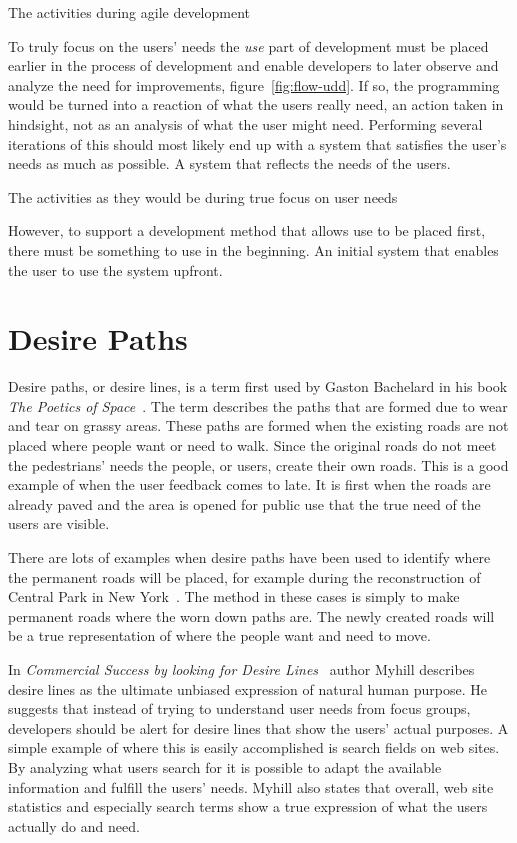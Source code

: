 \documentclass[a4paper]{report}
\begin{document}
	{The activities during agile development}

\label{sec:use-first}To truly focus on the users' needs the \emph{use} part of development must be placed earlier in the process of development and enable developers to later observe and analyze the need for improvements, figure~\ref{fig:flow-udd}. If so, the programming would be turned into a reaction of what the users really need, an action taken in hindsight, not as an analysis of what the user might need. Performing several iterations of this should most likely end up with a system that satisfies the user’s needs as much as possible. A system that reflects the needs of the users.

	{The activities as they would be during true focus on user needs}

However, to support a development method that allows use to be placed first, there must be something to use in the beginning. An initial system that enables the user to use the system upfront.

\section{Desire Paths}
\label{sec:desirepaths}
Desire paths, or desire lines, is a term first used by Gaston Bachelard in his book \emph{The Poetics of Space}~\cite{Bachelard:1994}. The term describes the paths that are formed due to wear and tear on grassy areas. These paths are formed when the existing roads are not placed where people want or need to walk. Since the original roads do not meet the pedestrians' needs the people, or users, create their own roads. This is a good example of when the user feedback comes to late. It is first when the roads are already paved and the area is opened for public use that the true need of the users are visible.

There are lots of examples when desire paths have been used to identify where the permanent roads will be placed, for example during the reconstruction of Central Park in New York~\cite{Barlow-Rogers:1987}. The method in these cases is simply to make permanent roads where the worn down paths are. The newly created roads will be a true representation of where the people want and need to move.

In \emph{Commercial Success by looking for Desire Lines}~\cite{Myhill:2004} author Myhill describes desire lines as the ultimate unbiased expression of natural human purpose. He suggests that instead of trying to understand user needs from focus groups, developers should be alert for desire lines that show the users' actual purposes. A simple example of where this is easily accomplished is search fields on web sites. By analyzing what users search for it is possible to adapt the available information and fulfill the users' needs. Myhill also states that overall, web site statistics and especially search terms show a true expression of what the users actually do and need.
\end{document}
